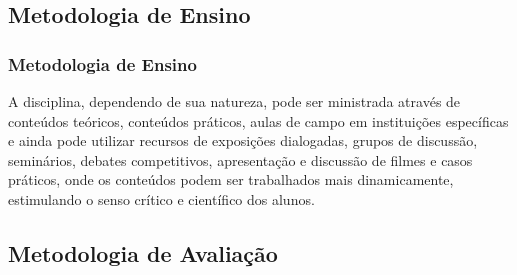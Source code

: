 \subsection[Metodologia de Ensino]{Metodologia de Ensino}\label{subsec:sec02-metodologia-ensino}



\begin{frame}[t]\frametitle{Metodologia de Ensino}

  \begin{block}{}
    \justifying{}
    A disciplina, dependendo de sua natureza, pode ser ministrada através de conteúdos teóricos, conteúdos práticos, aulas de campo em instituições específicas e ainda pode utilizar recursos de exposições dialogadas, grupos de discussão, seminários, debates competitivos, apresentação e discussão de filmes e casos práticos, onde os conteúdos podem ser trabalhados mais dinamicamente, estimulando o senso crítico e científico dos alunos.
  \end{block}

\end{frame}



\subsection[Metodologia de Avaliação]{Metodologia de Avaliação}\label{subsec:sec02-metodologia-avaliacao}



